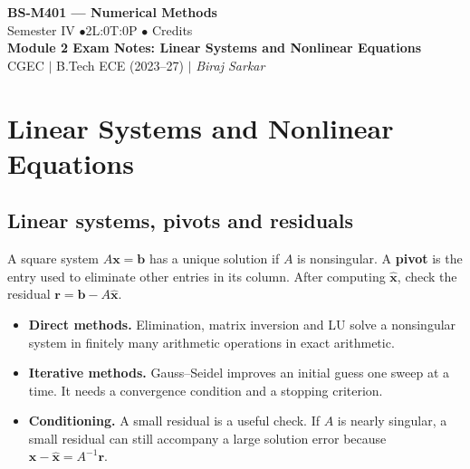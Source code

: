 \documentclass[12pt,a4paper]{article}
\begin{document}
\begin{center}
  {\LARGE\bfseries\color{myred} BS-M401 --- Numerical Methods}\\[5pt]
  {\normalsize\color{mydark} Semester IV \quad$\bullet$\quad 2L:0T:0P \quad$\bullet$ Credits}\\[3pt]
  {\normalsize\color{myteal}\textbf{Module 2 Exam Notes: Linear Systems and Nonlinear Equations}}\\[3pt]
  {\small\color{mydark} CGEC \;$|$\; B.Tech ECE (2023--27) \;$|$\; \textit{Biraj Sarkar}}
\end{center}
\vspace{2pt}
\noindent{\color{myred}\rule{\linewidth}{1.5pt}}
\vspace{2pt}

\hypersetup{linkcolor=mydark}
\tableofcontents
\hypersetup{linkcolor=myteal}
\newpage

\section{Linear Systems and Nonlinear Equations}
\subsection{Linear systems, pivots and residuals}
\begin{tcolorbox}[defbox, title={Linear system}]
A square system $A\mathbf{x}=\mathbf{b}$ has a unique solution if $A$ is nonsingular. A \textbf{pivot} is the entry used to eliminate other entries in its column. After computing $\hat{\mathbf{x}}$, check the residual $\mathbf{r}=\mathbf{b}-A\hat{\mathbf{x}}$.
\end{tcolorbox}

\begin{itemize}[leftmargin=*, itemsep=3pt, topsep=4pt]
  \item \textbf{Direct methods.} Elimination, matrix inversion and LU solve a nonsingular system in finitely many arithmetic operations in exact arithmetic.
  \item \textbf{Iterative methods.} Gauss--Seidel improves an initial guess one sweep at a time. It needs a convergence condition and a stopping criterion.
  \item \textbf{Conditioning.} A small residual is a useful check. If $A$ is nearly singular, a small residual can still accompany a large solution error because $\mathbf{x}-\hat{\mathbf{x}}=A^{-1}\mathbf{r}$.
\end{itemize}
\end{document}
